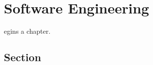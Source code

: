 \let\textcircled=\pgftextcircled
\chapter{Software Engineering}
\label{chap:software-engineering}

egins a chapter. 
\section{Section}
\label{sec:eng}

